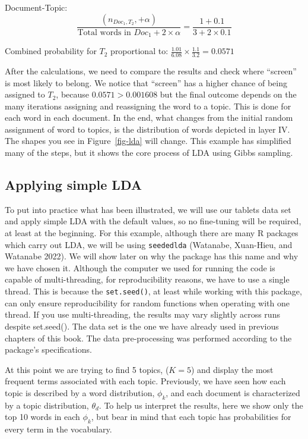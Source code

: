 Document-Topic:
\[\frac{(n_{Doc_1,T_2}, +\alpha)}{\text{Total words in }Doc_1 + 2 \times \alpha} = \frac{1+0.1}{3+2\times 0.1} \]

Combined probability for \(T_2\) proportional to:
\(\frac{1.01}{6.08}\times\frac{1.1}{3.2}=0.0571\)

After the calculations, we need to compare the results and check where
``screen'' is most likely to belong. We notice that ``screen'' has a
higher chance of being assigned to \(T_2\), because
\(0.0571 > 0.001608\) but the final outcome depends on the many
iterations assigning and reassigning the word to a topic. This is done for each word in each document. In the end, what
changes from the initial random assignment of word to topics, is the
distribution of words depicted in layer IV. The shapes you see in
Figure~\ref{fig-lda} will change. This example has simplified many of the steps,
but it shows the core process of LDA using Gibbs sampling.

\subsection{Applying simple LDA}\label{apply-simple-lda}

To put into practice what has been illustrated, we will use our
tablets data set and apply simple LDA with the default values, so no
fine-tuning will be required, at least at the beginning. For this example, although
there are many R packages which carry out LDA, we will be using
\texttt{seededlda} (Watanabe, Xuan-Hieu, and Watanabe 2022). We will
show later on why the package has this name and why we have chosen it.
Although the computer we used for running the code is capable of
multi-threading, for reproducibility reasons, we have to use a single
thread. This is because the \texttt{set.seed()}, at least while working
with this package, can only ensure reproducibility for random functions
when operating with one thread. If you use multi-threading, the results may vary slightly across runs despite set.seed().
The data set is the one we have already used
in previous chapters of this book. The data pre-processing was performed
according to the package's specifications.

At this point we are trying to find 5 topics, (\(K=5\)) and display the most
frequent terms associated with each topic. Previously, we have seen how
each topic is described by a word distribution, \(\phi_k\), and each
document is characterized by a topic distribution, \(\theta_d\). To help us interpret the results, here we show only the top 10 words in each \(\phi_k\), but
bear in mind that each topic has probabilities for every term in the
vocabulary.

